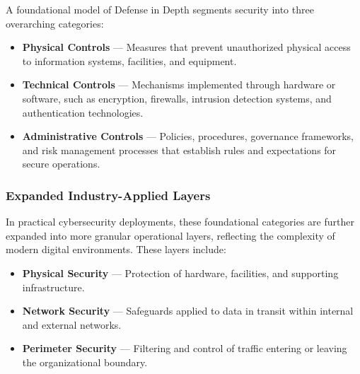 \begin{TNtwocol}
      \medskip

      A foundational model of Defense in Depth segments security into three overarching categories:\cite{NIST_SP800_12R1}

      \begin{itemize}
            \item \textbf{Physical Controls} — Measures that prevent unauthorized physical access to information systems, facilities, and equipment.

                  \smallskip

            \item \textbf{Technical Controls} — Mechanisms implemented through hardware or software, such as encryption, firewalls, intrusion detection systems, and authentication technologies.

                  \smallskip

            \item \textbf{Administrative Controls} — Policies, procedures, governance frameworks, and risk management processes that establish rules and expectations for secure operations.
      \end{itemize}

      \subsubsection{Expanded Industry-Applied Layers}

      \medskip

      In practical cybersecurity deployments, these foundational categories are further expanded into more granular operational layers, reflecting the complexity of modern digital environments. These layers include:\cite{NSA_Network_Guide_2023}

      \begin{itemize}
            \item \textbf{Physical Security} — Protection of hardware, facilities, and supporting infrastructure.

                  \smallskip

            \item \textbf{Network Security} — Safeguards applied to data in transit within internal and external networks.\cite{NIST_SP800_52R2}

                  \smallskip

            \item \textbf{Perimeter Security} — Filtering and control of traffic entering or leaving the organizational boundary.\cite{NIST_SP800_41R1}


\end{itemize}
\end{TNtwocol}
